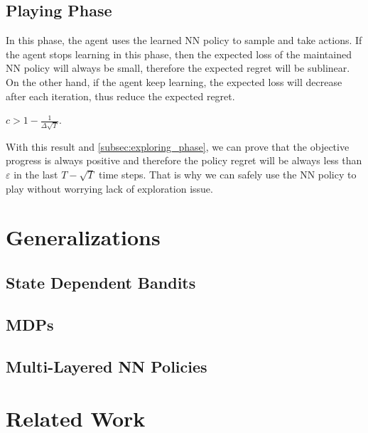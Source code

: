 \subsection{Playing Phase}
\label{subsec:playing_phase}

In this phase, the agent uses the learned NN policy to sample and take actions. If the agent stops learning in this phase, then the expected loss of the maintained NN policy will always be small, therefore the expected regret will be sublinear. On the other hand, if the agent keep learning, the expected loss will decrease after each iteration, thus reduce the expected regret.

\begin{lem}
    $c > 1 - \frac{1}{\Delta \sqrt{T}}$.
\end{lem}

With this result and \cref{subsec:exploring_phase}, we can prove that the objective progress is always positive and therefore the policy regret will be always less than $\varepsilon$ in the last $T - \sqrt{T}$ time steps. That is why we can safely use the NN policy to play without worrying lack of exploration issue.

\section{Generalizations}

\subsection{State Dependent Bandits}

\subsection{MDPs}

\subsection{Multi-Layered NN Policies}

\section{Related Work}




\nocite{langley00}
\fi


